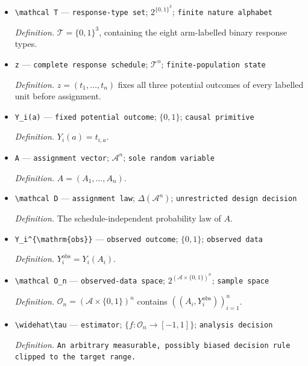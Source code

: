\documentclass{article}
\begin{document}
\begin{itemize}
  \item \texttt{\textbackslash{}\allowbreak{}mathcal T} --- \texttt{response-\allowbreak{}type set}; \(2^{\{0,1\}^3}\); \texttt{finite nature alphabet}
  \par\smallskip\noindent\emph{Definition.} \(\mathcal T=\{0,1\}^3\), containing the eight arm-labelled binary response types.
  \item \texttt{z} --- \texttt{complete response schedule}; \(\mathcal T^n\); \texttt{finite-\allowbreak{}population state}
  \par\smallskip\noindent\emph{Definition.} \(z=(t_1,\ldots,t_n)\) fixes all three potential outcomes of every labelled unit before assignment.
  \item \texttt{Y\_\allowbreak{}i(a)} --- \texttt{fixed potential outcome}; \(\{0,1\}\); \texttt{causal primitive}
  \par\smallskip\noindent\emph{Definition.} \(Y_i(a)=t_{i,a}\).
  \item \texttt{A} --- \texttt{assignment vector}; \(\mathcal A^n\); \texttt{sole random variable}
  \par\smallskip\noindent\emph{Definition.} \(A=(A_1,\ldots,A_n)\).
  \item \texttt{\textbackslash{}\allowbreak{}mathcal D} --- \texttt{assignment law}; \(\Delta(\mathcal A^n)\); \texttt{unrestricted design decision}
  \par\smallskip\noindent\emph{Definition.} The schedule-independent probability law of \(A\).
  \item \texttt{Y\_\allowbreak{}i\textasciicircum{}\{\textbackslash{}\allowbreak{}mathrm\{obs\}\allowbreak{}\}\allowbreak{}} --- \texttt{observed outcome}; \(\{0,1\}\); \texttt{observed data}
  \par\smallskip\noindent\emph{Definition.} \(Y_i^{\mathrm{obs}}=Y_i(A_i)\).
  \item \texttt{\textbackslash{}\allowbreak{}mathcal O\_\allowbreak{}n} --- \texttt{observed-\allowbreak{}data space}; \(2^{(\mathcal A\times\{0,1\})^n}\); \texttt{sample space}
  \par\smallskip\noindent\emph{Definition.} \(\mathcal O_n=(\mathcal A\times\{0,1\})^n\) contains \(((A_i,Y_i^{\mathrm{obs}}))_{i=1}^n\).
  \item \texttt{\textbackslash{}\allowbreak{}widehat\textbackslash{}\allowbreak{}tau} --- \texttt{estimator}; \(\{f:\mathcal O_n\to[-1,1]\}\); \texttt{analysis decision}
  \par\smallskip\noindent\emph{Definition.} \texttt{An arbitrary measurable,\allowbreak{} possibly biased decision rule clipped to the target range.}

\end{itemize}
\end{document}
